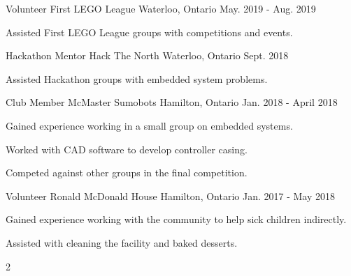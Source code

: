 
\begin{cventries}

  \cventry
    {Volunteer} %
    {First LEGO League} %
    {Waterloo, Ontario} %
    {May. 2019 - Aug. 2019} %
    {
      \begin{cvitems} %
        \item {Assisted First LEGO League groups with competitions and events.}
      \end{cvitems}
    }

  \cventry
    {Hackathon Mentor} %
    {Hack The North} %
    {Waterloo, Ontario} %
    {Sept. 2018} %
    {
      \begin{cvitems} %
        \item {Assisted Hackathon groups with embedded system problems.}
      \end{cvitems}
    }

  \cventry
    {Club Member} %
    {McMaster Sumobots} %
    {Hamilton, Ontario} %
    {Jan. 2018 - April 2018} %
    {
      \begin{cvitems} %
        \item {Gained experience working in a small group on embedded systems.}
        \item {Worked with CAD software to develop controller casing.}
        \item {Competed against other groups in the final competition.}
      \end{cvitems}
    }
    
  \cventry
    {Volunteer} %
    {Ronald McDonald House} %
    {Hamilton, Ontario} %
    {Jan. 2017 - May 2018} %
    {
      \begin{cvitems} %
        \item {Gained experience working with the community to help sick children indirectly.}
        \item {Assisted with cleaning the facility and baked desserts.}
      \end{cvitems}
    }

2
\end{cventries}

